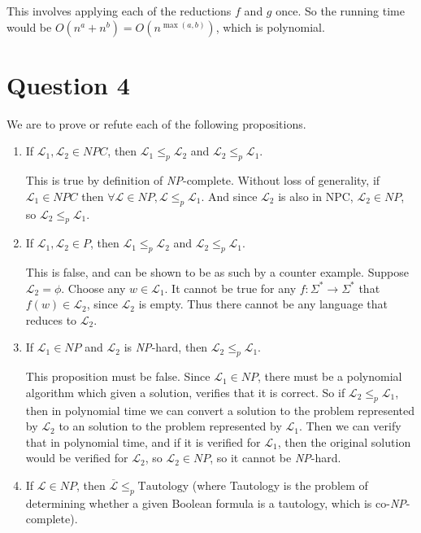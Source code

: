 \documentclass{article}
\newcommand{\lang}{\mathcal{L}}
\begin{document}
This involves applying each of the reductions \(f\) and \(g\) once. So the running time would be \(O(n^a + n^b) = O(n^{\max(a, b)})\), which is polynomial.

\section*{Question 4}

We are to prove or refute each of the following propositions.

\begin{enumerate}[label=\alph*.]
	\item
		If \(\lang_1, \lang_2 \in \mathit{NPC}\), then \(\lang_1 \leq_p \lang_2\) and \(\lang_2 \leq_p \lang_1\).

		This is true by definition of \textit{NP}-complete. Without loss of generality, if \(\lang_1 \in \mathit{NPC}\) then \(\forall \lang \in \mathit{NP}, \lang \leq_p \lang_1\). And since \(\lang_2\) is also in NPC, \(\lang_2 \in NP\), so \(\lang_2 \leq_p \lang_1\).

	\item
		If \(\lang_1, \lang_2 \in P\), then \(\lang_1 \leq_p \lang_2\) and \(\lang_2 \leq_p \lang_1\).

		This is false, and can be shown to be as such by a counter example. Suppose \(\lang_2 = \phi\). Choose any \(w \in \lang_1\). It cannot be true for any \(f: \Sigma^* \to \Sigma^*\) that \(f(w) \in \lang_2\), since \(\lang_2\) is empty. Thus there cannot be any language that reduces to \(\lang_2\).

	\item
		If \(\lang_1 \in \mathit{NP}\) and \(\lang_2\) is \textit{NP}-hard, then \(\lang_2 \leq_p \lang_1\).

		This proposition must be false. Since \(\lang_1 \in \mathit{NP}\), there must be a polynomial algorithm which given a solution, verifies that it is correct. So if \(\lang_2 \leq_p \lang_1\), then in polynomial time we can convert a solution to the problem represented by \(\lang_2\) to an solution to the problem represented by \(\lang_1\). Then we can verify that in polynomial time, and if it is verified for \(\lang_1\), then the original solution would be verified for \(\lang_2\), so \(\lang_2 \in \mathit{NP}\), so it cannot be \textit{NP}-hard.

	\item
		If \(\lang \in \mathit{NP}\), then \(\overline{\lang} \leq_p \text{Tautology}\) (where Tautology is the problem of determining whether a given Boolean formula is a tautology, which is co-\textit{NP}-complete).


\end{enumerate}
\end{document}
